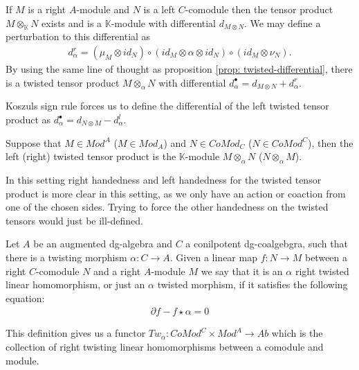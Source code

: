 \documentclass[../thesis.tex]{subfiles}
\begin{document}
            If $M$ is a right $A$-module and $N$ is a left $C$-comodule then the tensor product $M\otimes_\mathbb{K} N$ exists and is a $\mathbb{K}$-module with differential $d_{M\otimes N}$. We may define a perturbation to this differential as 
            \begin{align*}
                d_\alpha^r = (\mu_M\otimes id_N) \circ (id_M \otimes \alpha \otimes id_N) \circ (id_M \otimes \nu_N).
            \end{align*}
            By using the same line of thought as proposition \ref{prop: twisted-differential}, there is a twisted tensor product $M\otimes_\alpha N$ with differential $d_\alpha^\bullet = d_{M\otimes N} + d_\alpha^r$.

            \begin{remark}
                Koszuls sign rule forces us to define the differential of the left twisted tensor product as $d_\alpha^\bullet = d_{N\otimes M} - d_\alpha^l$. 
            \end{remark}
            
            \begin{definition}
                Suppose that $M\in Mod^A$ ($M\in Mod_A$) and $N\in CoMod_C$ ($N\in CoMod^C$), then the left (right) twisted tensor product is the $\mathbb{K}$-module $M\otimes_\alpha N$ ($N\otimes_\alpha M$).
            \end{definition}

            In this setting right handedness and left handedness for the twisted tensor product is more clear in this setting, as we only have an action or coaction from one of the chosen sides. Trying to force the other handedness on the twisted tensors would just be ill-defined.

            \begin{definition}
                Let $A$ be an augmented dg-algebra and $C$ a conilpotent dg-coalgebgra, such that there is a twisting morphism $\alpha: C\rightarrow A$. Given a linear map $f: N \rightarrow M$ between a right $C$-comodule $N$ and a right $A$-module $M$ we say that it is an $\alpha$ right twisted linear homomorphism, or just an  $\alpha$ twisted morphism, if it satisfies the following equation:
                \begin{align*}
                    \partial f - f\star \alpha = 0
                \end{align*} 
            \end{definition}

            This definition gives us a functor $Tw_\alpha : CoMod^C \times Mod^A \rightarrow Ab$ which is the collection of right twisting linear homomorphisms between a comodule and module.
\end{document}
